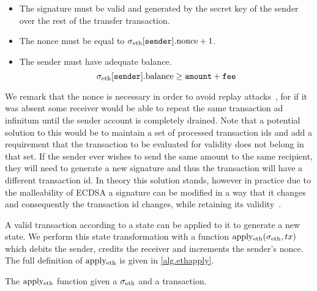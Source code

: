 \begin{itemize}
    \item The signature must be valid and generated by the secret key of the sender over the rest of the transfer transaction.
    \item The nonce must be equal to $\sigma_\text{eth}[\texttt{sender}].\text{nonce} + 1$.
    \item The sender must have adequate balance.
    \[
        \sigma_\text{eth}[\texttt{sender}].\text{balance} \ge \texttt{amount}+\texttt{fee}
    \]
\end{itemize}

We remark that the nonce is necessary in order to avoid replay attacks~\cite{ethereum-glossary}, for if it was absent some receiver would be able to repeat the same transaction ad infinitum until the sender account is completely drained. Note that a potential solution to this would be to maintain a set of processed transaction ids and add a requirement that the transaction to be evaluated for validity does not belong in that set. If the sender ever wishes to send the same amount to the same recipient, they will need to generate a new signature and thus the transaction will have a different transaction id. In theory this solution stands, however in practice due to the malleability of ECDSA a signature can be modified in a way that it changes and consequently the transaction id changes, while retaining its validity~\cite{malleability}.

\def\ethapply{\text{apply}\textsubscript{eth}}

A valid transaction according to a state can be applied to it to generate a new state. We perform this state transformation with a function $\ethapply(\ethstate, tx)$ which debits the sender, credits the receiver and increments the sender's nonce. The full definition of $\ethapply$ is given in \cref{alg.ethapply}.

\begin{algorithm}[H]
    \caption{\label{alg.ethapply} The $\ethapply$ function given a $\ethstate$ and a transaction.}
    \begin{algorithmic}[1]
        \Function{$\ethapply$}{$\ethstate, tx$}
            \State\Return{$\ethstate$}
        \EndFunction
    \end{algorithmic}
\end{algorithm}

